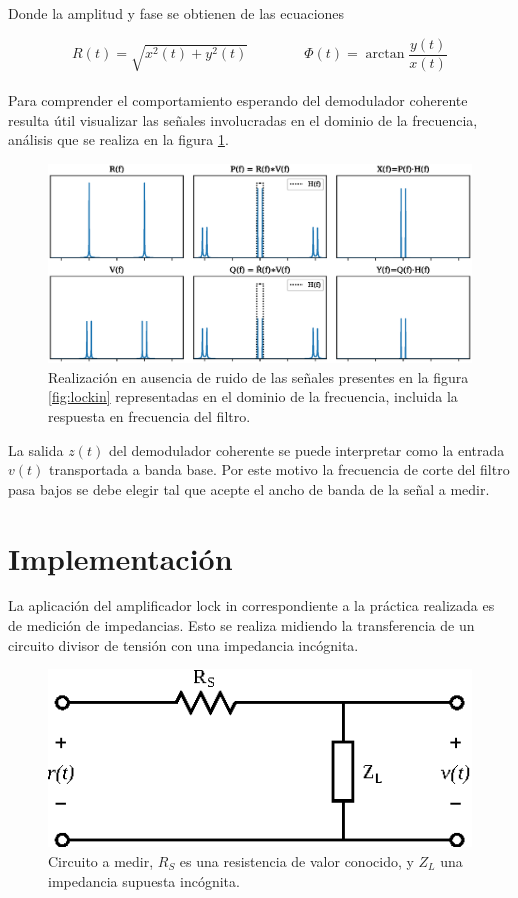 \documentclass[11pt,a4paper]{extarticle}
\begin{document}
\begin{multicols}{2}
Donde la amplitud y fase se obtienen de las ecuaciones

\begin{equation*}
	R(t) = \sqrt{x^2(t)+y^2(t)} \qquad \qquad \Phi(t) = \arctan\frac{y(t)}{x(t)}
\end{equation*}\\


Para comprender el comportamiento esperando del demodulador coherente resulta útil visualizar las señales involucradas en el dominio de la frecuencia, análisis que se realiza en la figura \ref{fig:sigs_fourier}.

\begin{figure}[H]
	\centering
	\includegraphics[width=\linewidth]{Images/sigs_fourier.eps}
	\caption{Realización en ausencia de ruido de las señales presentes en la figura \ref{fig:lockin} representadas en el dominio de la frecuencia, incluida la respuesta en frecuencia del filtro.}
	\label{fig:sigs_fourier}
\end{figure}

La salida $z(t)$ del demodulador coherente se puede interpretar como la entrada $v(t)$ transportada a banda base. Por este motivo la frecuencia de corte del filtro pasa bajos se debe elegir tal que acepte el ancho de banda de la señal a medir.

\section{Implementación}

La aplicación del amplificador lock in correspondiente a la práctica realizada es de medición de impedancias. Esto se realiza midiendo la transferencia de un circuito divisor de tensión con una impedancia incógnita.

\begin{figure}[H]
	\centering
	\includegraphics[width=0.75\linewidth]{Images/transferencia.eps}
	\caption{Circuito a medir, $R_S$ es una resistencia de valor conocido, y $Z_L$ una impedancia supuesta incógnita.}
	\label{fig:transferencia}
\end{figure}


\end{multicols}
\end{document}
